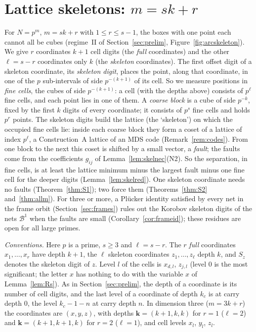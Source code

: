 \documentclass[11pt]{amsart}
\theoremstyle{definition}
\theoremstyle{plain}
\begin{document}
\section{Lattice skeletons: \texorpdfstring{$m=sk+r$}{m=sk+r}}\label{sec:skel}
For $N=p^m$, $m=sk+r$ with $1\le r\le s-1$, the boxes with one point each cannot all be cubes (regime~II of Section~\ref{sec:prelim}, Figure~\ref{fig:arcskeleton}). We give $r$ coordinates $k+1$ cell digits (the \emph{full} coordinates) and the other $\ell=s-r$ coordinates only $k$ (the \emph{skeleton} coordinates). The first offset digit of a skeleton coordinate, its \emph{skeleton digit}, places the point, along that coordinate, in one of the $p$ sub-intervals of side $p^{-(k+1)}$ of its cell. So we measure positions in \emph{fine cells}, the cubes of side $p^{-(k+1)}$: a cell (with the depths above) consists of $p^\ell$ fine cells, and each point lies in one of them. A \emph{coarse block} is a cube of side $p^{-k}$, fixed by the first $k$ digits of every coordinate; it consists of $p^s$ fine cells and holds $p^r$ points. The skeleton digits build the lattice (the `skeleton') on which the occupied fine cells lie: inside each coarse block they form a coset of a lattice of index $p^\ell$, a Construction~A lattice of an MDS code (Remark~\ref{rem:codes}). From one block to the next this coset is shifted by a small vector, a \emph{fault}; the faults come from the coefficients $g_{ij}$ of Lemma~\ref{lem:skelnec}(N2). So the separation, in fine cells, is at least the lattice minimum minus the largest fault minus one fine cell for the deeper digits (Lemma~\ref{lem:skelred}). One skeleton coordinate needs no faults (Theorem~\ref{thm:S1}); two force them (Theorems~\ref{thm:S2} and~\ref{thm:allm}). For three or more, a Pl\"ucker identity satisfied by every net in the frame orbit (Section~\ref{sec:frames}) rules out the Korobov skeleton digits of the nets $\mathcal B^1$ when the faults are small (Corollary~\ref{cor:frameid}); these residues are open for all large primes.

\emph{Conventions.} Here $p$ is a prime, $s\ge3$ and $\ell=s-r$. The $r$ \emph{full} coordinates $x_1,\dots,x_r$ have depth $k+1$, the $\ell$ skeleton coordinates $z_1,\dots,z_\ell$ depth $k$, and $S_z$ denotes the skeleton digit of $z$. Level $l$ of the cells is $x_{d,l}$, $z_{j,l}$ (level $0$ is the most significant; the letter $x$ has nothing to do with the variable $x$ of Lemma~\ref{lem:Rs}). As in Section~\ref{sec:prelim}, the depth of a coordinate is its number of cell digits, and the last level of a coordinate of depth $k_c$ is at carry depth $0$, the level $k_c-1-n$ at carry depth $n$. In dimension three ($m=3k+r$) the coordinates are $(x,y,z)$, with depths $\mathbf k=(k+1,k,k)$ for $r=1$ ($\ell=2$) and $\mathbf k=(k+1,k+1,k)$ for $r=2$ ($\ell=1$), and cell levels $x_l$, $y_l$, $z_l$.
\end{document}
